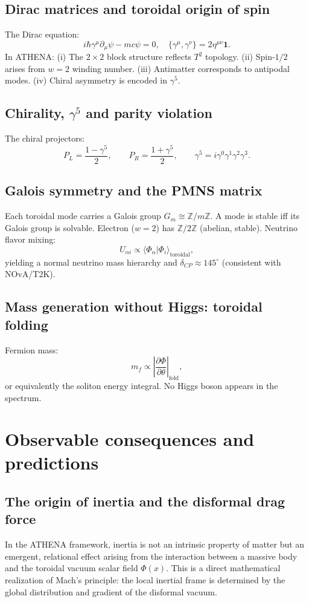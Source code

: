 \documentclass[11pt,a4paper]{article}
\begin{document}
\subsection{Dirac matrices and toroidal origin of spin}
\label{subsec:dirac}
The Dirac equation:
\[
i\hbar \gamma^\mu \partial_\mu \psi - m c \psi = 0, \quad \{\gamma^\mu,\gamma^\nu\} = 2\eta^{\mu\nu}\mathbf{1}. \tag{29}
\]
In ATHENA: (i) The \(2\times2\) block structure reflects \(T^2\) topology. (ii) Spin-\(1/2\) arises from \(w=2\) winding number. (iii) Antimatter corresponds to antipodal modes. (iv) Chiral asymmetry is encoded in \(\gamma^5\).

\subsection{Chirality, \(\gamma^5\) and parity violation}
\label{subsec:chirality}
The chiral projectors:
\[
P_L = \frac{1 - \gamma^5}{2},\qquad P_R = \frac{1 + \gamma^5}{2},\qquad \gamma^5 = i\gamma^0\gamma^1\gamma^2\gamma^3. \tag{30}
\]

\subsection{Galois symmetry and the PMNS matrix}
\label{subsec:galois}
Each toroidal mode carries a Galois group \(G_m \cong \mathbb{Z}/m\mathbb{Z}\). A mode is stable iff its Galois group is solvable. Electron (\(w=2\)) has \(\mathbb{Z}/2\mathbb{Z}\) (abelian, stable). Neutrino flavor mixing:
\[
U_{\alpha i} \propto \langle \Phi_\alpha | \Phi_i \rangle_{\mathrm{toroidal}}, \tag{31}
\]
yielding a normal neutrino mass hierarchy and \(\delta_{CP} \approx 145^\circ\) (consistent with NOvA/T2K).

\subsection{Mass generation without Higgs: toroidal folding}
\label{subsec:mass}
Fermion mass:
\[
m_f \propto \left| \frac{\partial \Phi}{\partial \theta} \right|_{\mathrm{fold}}, \tag{32}
\]
or equivalently the soliton energy integral. No Higgs boson appears in the spectrum.

\section{Observable consequences and predictions}
\label{sec:predictions}
\subsection{The origin of inertia and the disformal drag force}
\label{subsec:inertia}
In the ATHENA framework, inertia is not an intrinsic property of matter but an emergent, relational effect arising from the interaction between a massive body and the toroidal vacuum scalar field \(\Phi(x)\). This is a direct mathematical realization of Mach's principle: the local inertial frame is determined by the global distribution and gradient of the disformal vacuum.
\end{document}
